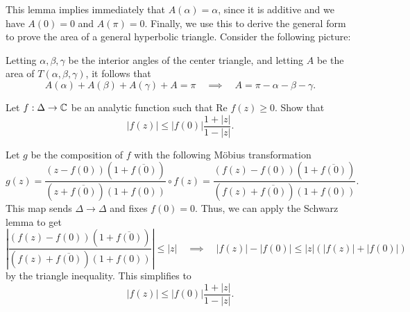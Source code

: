 \documentclass{pset}
\begin{document}
\begin{solution}
  This lemma implies immediately that $A(\alpha)=\alpha$, since it is additive and we have $A(0)=0$ and $A(\pi)=0$. Finally, we use this to derive the general form to prove the area of a general hyperbolic triangle. Consider the following picture:

  \medskip
  \begin{center}
  \end{center}

 Letting $\alpha, \beta,\gamma$ be the interior angles of the center triangle, and letting $A$ be the area of $T(\alpha,\beta,\gamma)$, it follows that
 \[A(\alpha)+A(\beta)+A(\gamma)+A = \pi\quad\implies \quad A = \pi - \alpha - \beta - \gamma.\]
\end{solution}

\begin{problem}{2.21}
  Let $f : \Delta \to \mathbb{C}$ be an analytic function such that $\textrm{Re } f(z)\geq 0$. Show that \[|f(z)| \leq |f(0)|\frac{1+|z|}{1-|z|}.\]
\end{problem}

\begin{solution}
  Let $g$ be the composition of $f$ with the following M\"obius transformation
  \[ g(z) = \frac{(z-f(0))(1+\overline{f(0)})}{(z+\overline{f(0)})(1+f(0))}\circ f(z) = \frac{(f(z)-f(0))(1+\overline{f(0)})}{(f(z)+\overline{f(0)})(1+f(0))}.\]
  This map sends $\Delta \to \Delta$ and fixes $f(0)=0$. Thus, we can apply the Schwarz lemma to get
  \[\left|\frac{(f(z)-f(0))(1+\overline{f(0)})}{(f(z)+\overline{f(0)})(1+f(0))}\right|\leq |z|\quad \implies \quad |f(z)|-|f(0)| \leq |z|(|f(z)|+|f(0)|)\]
  by the triangle inequality. This simplifies to
  \[|f(z)| \leq |f(0)|\frac{1+|z|}{1-|z|}.\]
\end{solution}
\end{document}
